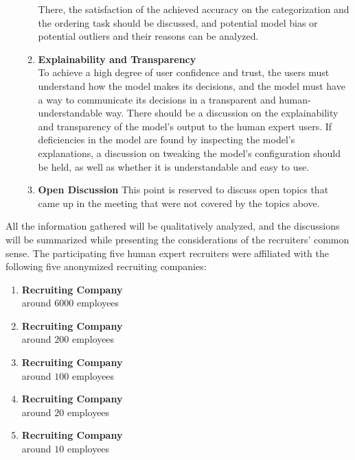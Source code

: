 \documentclass[draft,final]{thesisclass} %
\begin{document}
\begin{enumerate}
\begin{enumerate}
        There, the satisfaction of the achieved accuracy on the categorization and the ordering task should be discussed, and potential model bias or potential outliers and their reasons can be analyzed.
        \item \textbf{Explainability and Transparency}\\
        To achieve a high degree of user confidence and trust, the users must understand how the model makes its decisions, and the model must have a way to communicate its decisions in a transparent and human-understandable way.
        There should be a discussion on the explainability and transparency of the model's output to the human expert users.
        If deficiencies in the model are found by inspecting the model's explanations, a discussion on tweaking the model's configuration should be held, as well as whether it is understandable and easy to use.
        \item \textbf{Open Discussion}
        This point is reserved to discuss open topics that came up in the meeting that were not covered by the topics above.
    \end{enumerate}
\end{enumerate}
All the information gathered will be qualitatively analyzed, and the discussions will be summarized while presenting the considerations of the recruiters' common sense.
The participating five human expert recruiters were affiliated with the following five anonymized recruiting companies:
\begin{enumerate}
    \item \textbf{Recruiting Company}\\
    around $6000$ employees
    \item \textbf{Recruiting Company}\\
    around $200$ employees
    \item \textbf{Recruiting Company}\\
    around $100$ employees
    \item \textbf{Recruiting Company}\\
    around $20$ employees
    \item \textbf{Recruiting Company}\\
    around $10$ employees
\end{enumerate}
\end{document}
